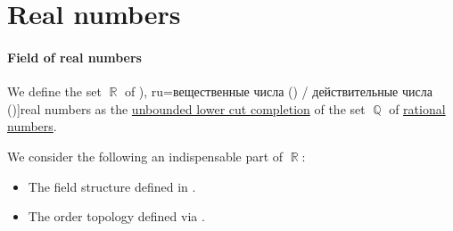 \section{Real numbers}\label{sec:real_numbers}

\paragraph{Field of real numbers}

\begin{definition}\label{def:real_numbers}
  We define the set \( \BbbR \) of \term[bg=реални числа (\cite[ch. I]{Тагамлицки1971ДиференциалноСмятане}), ru=вещественные числа (\cite[\S 3]{Фихтенгольц1968ОсновыАнализаТом1}) / действительные числа (\cite[def. 25.1]{АлександровМаркушевичХинчинИПр1951ЭнциклопедияТом1})]{real numbers} as the \hyperref[def:lower_cut_completion]{unbounded lower cut completion} of the set \( \BbbQ \) of \hyperref[def:rational_numbers]{rational numbers}.
\end{definition}
\begin{comments}
  \item We consider the following an indispensable part of \( \BbbR \):
  \begin{itemize}
    \item The field structure defined in .
    \item The order topology defined via .
  \end{itemize}
\end{comments}

